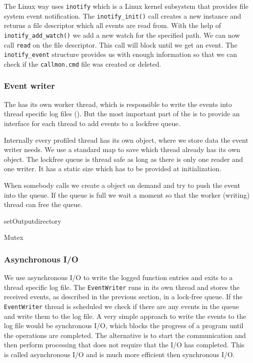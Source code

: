 The Linux way uses \verb=inotify= which is a Linux kernel subsystem that provides file system event notification. The \verb=inotify_init()= call creates a new instance and returns a file descriptor which all events are read from. With the help of \verb=inotify_add_watch()= we add a new watch for the specified path. We can now call \verb=read= on the file descriptor. This call will block until we get an event. The \verb=inotify_event= structure provides us with enough information so that we can check if the \verb=callmon.cmd= file was created or deleted.

\subsubsection{Event writer} 

The  has its own worker thread, which is responsible to write the events into thread specific log files (). But the most important part of the  is to provide an interface for each thread to add events to a lockfree queue.

Internally every profiled thread has its own  object, where we store data the event writer needs. We use a standard map to save which thread already has its own  object. The lockfree queue is thread safe as long as there is only one reader and one writer. It has a static size which has to be provided at initialization. 

When somebody calls  we create a  object on demand and try to push the event into the queue. If the queue is full we wait a moment so that the worker (writing) thread can free the queue.

setOutputdirectory

Mutex

\subsubsection{Asynchronous I/O}

We use asynchronous I/O to write the logged function entries and exits to a thread specific log file. The \verb=EventWriter= runs in its own thread and stores the received events, as described in the previous section, in a lock-free queue. If the \verb=EventWriter= thread is scheduled we check if there are any events in the queue and write them to the log file. A very simple approach to write the events to the log file would be synchronous I/O, which blocks the progress of a program until the operations are completed. The alternative is to start the communication and then perform processing that does not require that the I/O has completed. This is called asynchronous I/O and is much more efficient then synchronous I/O.

